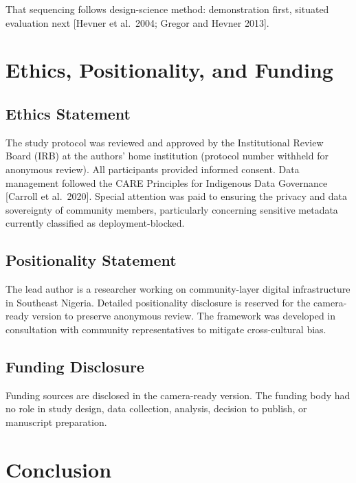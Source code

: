 \documentclass[sigconf,anonymous]{acmart}
\begin{document}
That sequencing follows design-science method: demonstration first, situated evaluation next [Hevner et al.\ 2004; Gregor and Hevner 2013].

\section{Ethics, Positionality, and Funding}

\subsection{Ethics Statement}

The study protocol was reviewed and approved by the Institutional Review Board (IRB) at the authors' home institution (protocol number withheld for anonymous review). All participants provided informed consent. Data management followed the CARE Principles for Indigenous Data Governance [Carroll et al.\ 2020]. Special attention was paid to ensuring the privacy and data sovereignty of community members, particularly concerning sensitive metadata currently classified as deployment-blocked.

\subsection{Positionality Statement}

The lead author is a researcher working on community-layer digital infrastructure in Southeast Nigeria. Detailed positionality disclosure is reserved for the camera-ready version to preserve anonymous review. The framework was developed in consultation with community representatives to mitigate cross-cultural bias.

\subsection{Funding Disclosure}

Funding sources are disclosed in the camera-ready version. The funding body had no role in study design, data collection, analysis, decision to publish, or manuscript preparation.

\section{Conclusion}
\end{document}
